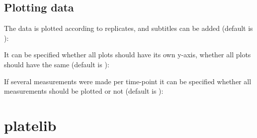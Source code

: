 \documentclass[letterpaper,10pt,english]{sphinxmanual}
\begin{document}
%
\begin{sphinxVerbatim}[commandchars=\\\{\}]
\end{sphinxVerbatim}


\section{Plotting data}
\label{\detokenize{cookbook:plotting-data}}
The data is plotted according to replicates, and subtitles can be added
(default is ):

%
\begin{sphinxVerbatim}[commandchars=\\\{\}]
\PYG{p}{[} \PYG{p}{]}
\end{sphinxVerbatim}

It can be specified whether all plots should have its own y-axis,
whether all plots should have the same (default is ):

%
\begin{sphinxVerbatim}[commandchars=\\\{\}]
\end{sphinxVerbatim}

If several measurements were made per time-point it can be
specified whether all measurements should be plotted or not
(default is ):

%
\begin{sphinxVerbatim}[commandchars=\\\{\}]
\end{sphinxVerbatim}


\chapter{platelib}
\label{\detokenize{modules:platelib}}\label{\detokenize{modules::doc}}
\end{document}
